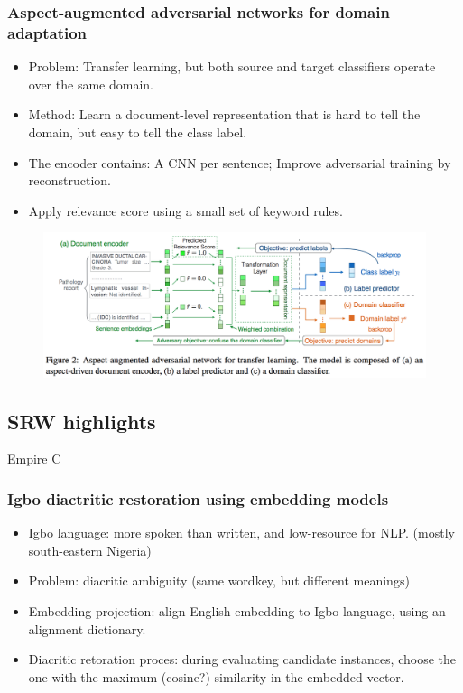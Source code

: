 \subsubsection{\cite{zhang2017aspect} Aspect-augmented adversarial networks for domain adaptation }

\begin{itemize}
	\item Problem: Transfer learning, but both source and target classifiers operate over the same domain.
	\item Method: Learn a document-level representation that is hard to tell the domain, but easy to tell the class label.
	\item The encoder contains:
	A CNN per sentence; Improve adversarial training by reconstruction.
	\item Apply relevance score using a small set of keyword rules. 
\end{itemize}
\begin{figure}[h]
	\centering
	\includegraphics[scale=0.6]{fig0602/zhang2017aspect}
\end{figure}


\subsection{SRW highlights}
Empire C

\subsubsection{\cite{Ezeani2018Igbo} Igbo diactritic restoration using embedding models}
\begin{itemize}
	\item Igbo language: more spoken than written, and low-resource for NLP. (mostly south-eastern Nigeria)
	\item Problem: diacritic ambiguity (same wordkey, but different meanings)
	\item Embedding projection: align English embedding to Igbo language, using an alignment dictionary.
	\item Diacritic retoration proces: during evaluating candidate instances, choose the one with the maximum (cosine?) similarity in the embedded vector.
\end{itemize}

